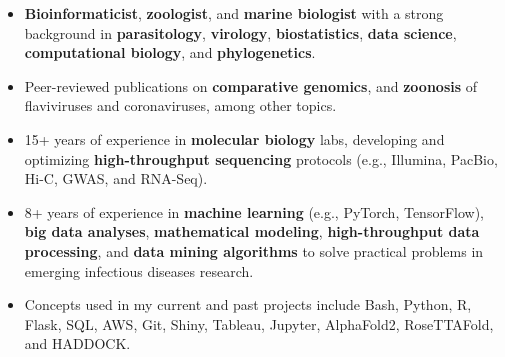 \documentclass[11pt, letterpaper, sans]{moderncv}
\begin{document}
    \thispagestyle{empty}
    \maketitle


\vspace{-4.5em}

\begin{itemize}[itemsep=0in, labelindent=0in, leftmargin=*]


\item \textbf{Bioinformaticist}, \textbf{zoologist}, and \textbf{marine biologist} with a strong background in \textbf{parasitology}, \textbf{virology}, \textbf{biostatistics}, \textbf{data science}, \textbf{computational biology}, and \textbf{phylogenetics}.

\item Peer-reviewed publications on \textbf{comparative genomics}, and \textbf{zoonosis} of flaviviruses and coronaviruses, among other topics.

\item 15+ years of experience in \textbf{molecular biology} labs, developing and optimizing \textbf{high-throughput sequencing} protocols (e.g., Illumina, PacBio, Hi-C, GWAS, and RNA-Seq).

\item 8+ years of experience in \textbf{machine learning} (e.g., PyTorch, TensorFlow), \textbf{big data analyses}, \textbf{mathematical modeling}, \textbf{high-throughput data processing}, and \textbf{data mining algorithms} to solve practical problems in emerging infectious diseases research.

\item Concepts used in my current and past projects include Bash, Python, R, Flask, SQL, AWS, Git, Shiny, Tableau, Jupyter, AlphaFold2, RoseTTAFold, and HADDOCK.

\end{itemize}
\end{document}
